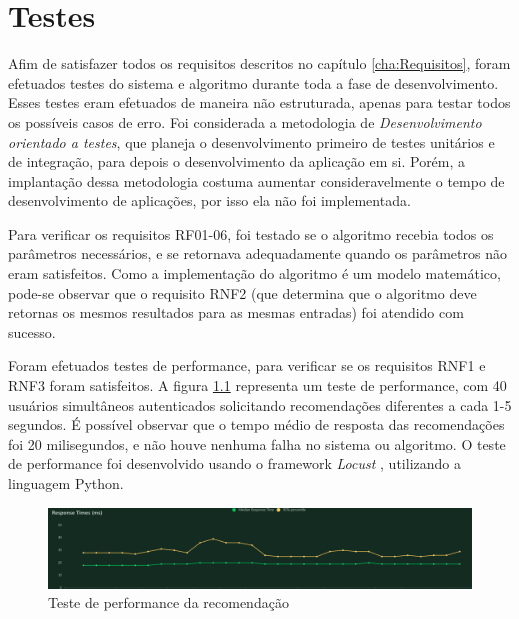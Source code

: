 \chapter{Testes}
\label{cha:Testes}

Afim de satisfazer todos os requisitos descritos no capítulo \ref{cha:Requisitos}, foram efetuados testes do sistema e algoritmo durante toda a fase de desenvolvimento. Esses testes eram efetuados de maneira não estruturada, apenas para testar todos os possíveis casos de erro. Foi considerada a metodologia de \textit{Desenvolvimento orientado a testes}, que planeja o desenvolvimento primeiro de testes unitários e de integração, para depois o desenvolvimento da aplicação em si. Porém, a implantação dessa metodologia costuma aumentar consideravelmente o tempo de desenvolvimento de aplicações, por isso ela não foi implementada.

Para verificar os requisitos RF01-06, foi testado se o algoritmo recebia todos os parâmetros necessários, e se retornava adequadamente quando os parâmetros não eram satisfeitos. Como a implementação do algoritmo é um modelo matemático, pode-se observar que o requisito RNF2 (que determina que o algoritmo deve retornas os mesmos resultados para as mesmas entradas) foi atendido com sucesso.

Foram efetuados testes de performance, para verificar se os requisitos RNF1 e RNF3 foram satisfeitos. A figura \ref{fig:teste-performance} representa um teste de performance, com 40 usuários simultâneos autenticados solicitando recomendações diferentes a cada 1-5 segundos. É possível observar que o tempo médio de resposta das recomendações foi 20 milisegundos, e não houve nenhuma falha no sistema ou algoritmo. O teste de performance foi desenvolvido usando o framework \textit{Locust} \cite{site-locust}, utilizando a linguagem Python.

\begin{figure}[ht]
    \begin{center}
    \includegraphics[width=390pt]{figuras/teste-performance.png}
    \caption{Teste de performance da recomendação}
    \label{fig:teste-performance}
    \end{center}
\end{figure}

